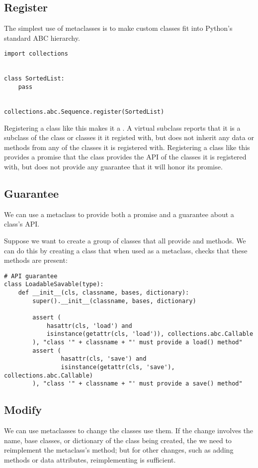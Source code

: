 \subsection{Register}
\label{sec:register}

The simplest use of metaclasses is to make custom classes fit into Python’s standard ABC hierarchy.
\begin{lstlisting}
import collections


class SortedList:
    pass


collections.abc.Sequence.register(SortedList)
\end{lstlisting}


Registering a class like this makes it a .
A virtual subclass reports that it is a subclass of the class or classes it it registed with, but does not inherit any data or methods from any of the classes it is registered with.
Registering a class like this provides a promise that the class provides the API of the classes it is registered with, but does not provide any guarantee that it will honor its promise.


\subsection{Guarantee}
\label{sec:guarantee}

We can use a metaclass to provide both a promise and a guarantee about a class's API.


Suppose we want to create a group of classes that all provide  and  methods.
We can do this by creating a class that when used as a metaclass, checks that these methods are present:

\begin{lstlisting}
# API guarantee
class LoadableSavable(type):
    def __init__(cls, classname, bases, dictionary):
        super().__init__(classname, bases, dictionary)

        assert (
            hasattr(cls, 'load') and
            isinstance(getattr(cls, 'load')), collections.abc.Callable
        ), "class '" + classname + "' must provide a load() method"
        assert (
                hasattr(cls, 'save') and
                isinstance(getattr(cls, 'save'), collections.abc.Callable)
        ), "class '" + classname + "' must provide a save() method"
\end{lstlisting}

\subsection{Modify}
\label{sec:modify}


We can use metaclasses to change the classes use them.
If the change involves the name, base classes, or dictionary of the class being created, the we need to reimplement the metaclass's  method; but for other changes, such as adding methods or data attributes, reimplementing  is sufficient.


